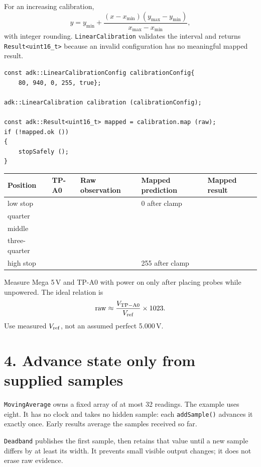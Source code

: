 \documentclass[11pt]{article}
\begin{document}
For an increasing calibration,
\[
y=y_{\min}+
\frac{(x-x_{\min})(y_{\max}-y_{\min})}{x_{\max}-x_{\min}},
\]
with integer rounding. \texttt{LinearCalibration} validates the interval and
returns \texttt{Result<uint16\_t>} because an invalid configuration has no
meaningful mapped result.

\begin{lstlisting}[style=adkcpp]
const adk::LinearCalibrationConfig calibrationConfig{
    80, 940, 0, 255, true};

adk::LinearCalibration calibration (calibrationConfig);

const adk::Result<uint16_t> mapped = calibration.map (raw);
if (!mapped.ok ())
{
    stopSafely ();
}
\end{lstlisting}

\begin{center}
\begin{tabularx}{0.92\linewidth}{@{}lXXXX@{}}
\toprule
Position & TP-A0 & Raw observation & Mapped prediction & Mapped result\\
\midrule
low stop & & & 0 after clamp &\\
quarter & & & &\\
middle & & & &\\
three-quarter & & & &\\
high stop & & & 255 after clamp &\\
\bottomrule
\end{tabularx}
\end{center}

Measure Mega 5\,V and TP-A0 with power on only after placing probes while
unpowered. The ideal relation is
\[
{\rm raw}\approx \frac{V_{\rm TP-A0}}{V_{\rm ref}}\times1023.
\]
Use measured \(V_{\rm ref}\), not an assumed perfect 5.000\,V.

\section*{4. Advance state only from supplied samples}

\texttt{MovingAverage} owns a fixed array of at most 32 readings. The example
uses eight. It has no clock and takes no hidden sample: each
\texttt{addSample()} advances it exactly once. Early results average the
samples received so far.

\texttt{Deadband} publishes the first sample, then retains that value until a
new sample differs by at least its width. It prevents small visible output
changes; it does not erase raw evidence.
\end{document}
